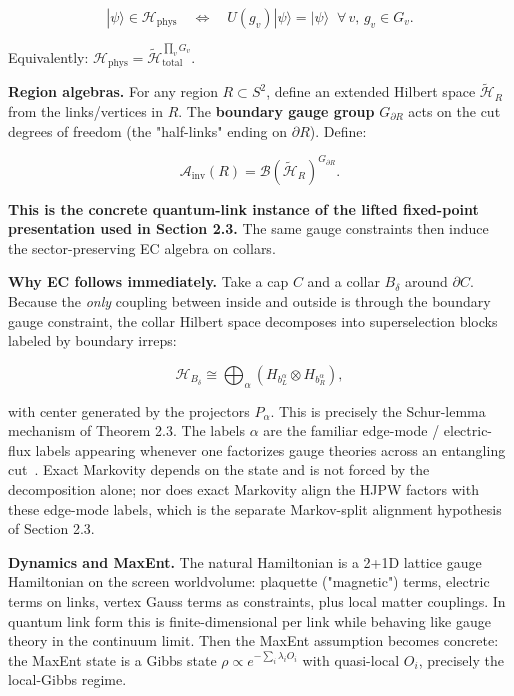 \[
|\psi\rangle \in \mathcal{H}_{\mathrm{phys}} \quad\Longleftrightarrow\quad U(g_v)|\psi\rangle = |\psi\rangle \;\;\forall\, v,\, g_v \in G_v.
\]

Equivalently: \(\mathcal{H}_{\mathrm{phys}} = \tilde{\mathcal{H}}_{\mathrm{total}}^{\prod_v G_v}\).

\textbf{Region algebras.} For any region \(R \subset S^2\), define an extended Hilbert space \(\tilde{\mathcal{H}}_R\) from the links/vertices in \(R\). The \textbf{boundary gauge group} \(G_{\partial R}\) acts on the cut degrees of freedom (the "half-links" ending on \(\partial R\)). Define:

\[
\mathcal{A}_{\mathrm{inv}}(R) = \mathcal{B}(\tilde{\mathcal{H}}_R)^{G_{\partial R}}.
\]

\textbf{This is the concrete quantum-link instance of the lifted fixed-point presentation used in Section 2.3.} The same gauge constraints then induce the sector-preserving EC algebra on collars.

\textbf{Why EC follows immediately.} Take a cap \(C\) and a collar \(B_\delta\) around \(\partial C\). Because the \emph{only} coupling between inside and outside is through the boundary gauge constraint, the collar Hilbert space decomposes into superselection blocks labeled by boundary irreps:

\[
\mathcal{H}_{B_\delta} \cong \bigoplus_\alpha (H_{b_L^\alpha} \otimes H_{b_R^\alpha}),
\]

with center generated by the projectors \(P_\alpha\). This is precisely the Schur-lemma mechanism of Theorem 2.3. The labels \(\alpha\) are the familiar edge-mode / electric-flux labels appearing whenever one factorizes gauge theories across an entangling cut~\cite{donnellyWall15}. Exact Markovity depends on the state and is not forced by the decomposition alone; nor does exact Markovity align the HJPW factors with these edge-mode labels, which is the separate Markov-split alignment hypothesis of Section 2.3.

\textbf{Dynamics and MaxEnt.} The natural Hamiltonian is a 2+1D lattice gauge Hamiltonian on the screen worldvolume: plaquette ("magnetic") terms, electric terms on links, vertex Gauss terms as constraints, plus local matter couplings. In quantum link form this is finite-dimensional per link while behaving like gauge theory in the continuum limit. Then the MaxEnt assumption becomes concrete: the MaxEnt state is a Gibbs state \(\rho \propto e^{-\sum_i \lambda_i O_i}\) with quasi-local \(O_i\), precisely the local-Gibbs regime.

